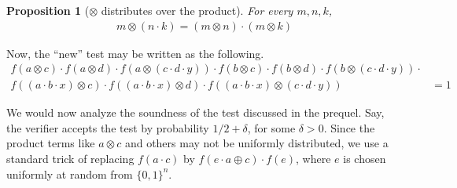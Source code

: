 \documentclass[11pt]{article}
\newtheorem{proposition}[theorem]{Proposition}
\newcommand{\eat}[1]{}
\begin{document}
\begin{proposition}[$\otimes$ distributes over the product] \label{distributive}
For every $m, n, k$, 
\begin{align*}
m \otimes (n \cdot k) = (m \otimes n) \cdot (m \otimes k)
\end{align*}
\end{proposition}
\noindent Now, the ``new'' test may be written as the following.
\begin{align*}
  f(a\otimes c) \cdot f(a \otimes d) \cdot f(a \otimes (c\cdot d \cdot y)) \cdot f(b \otimes c) \cdot f(b \otimes d) \cdot f(b \otimes (c\cdot d \cdot y)) \cdot & \\ f((a \cdot b \cdot x) \otimes c) \cdot f((a \cdot b \cdot x) \otimes d) \cdot f((a \cdot b \cdot x) \otimes (c \cdot d \cdot y))& = 1
\end{align*}
\eat{
\begin{proposition}\label{simplification}
For every $a, b, c, d, x, y$, the following holds 
\begin{align*}
  & (a \cdot b \cdot x) \otimes (c \cdot d \cdot y) & = (a \otimes c)  \cdot \left(a \otimes d\right) \cdot (a \otimes y) \cdot (b \otimes c) \cdot (b \otimes d) \cdot (b \otimes y) \cdot (x \otimes c) \cdot (x \otimes d) \cdot \left(x \otimes y)\right)\\ & \\
  \Leftrightarrow & (a \cdot b \cdot x) \otimes (c \cdot d \cdot y) \cdot (x \otimes y) &= (a \otimes c)  \cdot \left(a \otimes d\right) \cdot (a \otimes y) \cdot (b \otimes c) \cdot (b \otimes d) \cdot (b \otimes y) \cdot (x \otimes c) \cdot (x \otimes d) \\ & \\
 \leftrightarrow &  & 
\end{align*}
\end{proposition}
}


We would now analyze the soundness of the test discussed in the
prequel. Say, the verifier accepts the test by probability $1/2 +
\delta$, for some $\delta > 0$. Since the product terms like $a\otimes
c$ and others may not be uniformly distributed, we use a standard
trick of replacing $f(a\cdot c)$ by $f(e \cdot a\oplus c) \cdot f(e)$, where
$e$ is chosen uniformly at random from $\{0,1\}^{n}$.
\end{document}

